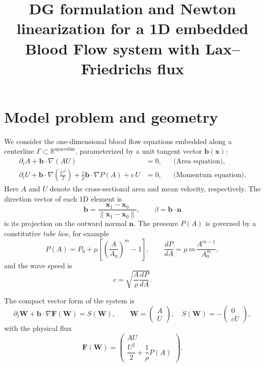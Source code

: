 \documentclass[11pt]{article}
\title{DG formulation and Newton linearization
for a 1D embedded Blood Flow system with Lax--Friedrichs flux}
\author{}
\date{}
\newcommand{\R}{\mathbb{R}}
\begin{document}
\maketitle

\section{Model problem and geometry}

We consider the one-dimensional blood flow equations embedded along a
centerline $\Gamma\subset\R^{\text{spacedim}}$, parameterized by a unit tangent
vector $\bm b(\bm x)$:
\begin{align}
  \partial_t A + \bm b\!\cdot\!\nabla (A U) &= 0,
  && \text{(Area equation)}, \label{eq:area-eq}\\[2mm]
  \partial_t U + \bm b\!\cdot\!\nabla\!\left(\frac{U^2}{2}\right)
  + \frac{1}{\rho}\bm b\!\cdot\!\nabla P(A)
  + c\,U &= 0,
  && \text{(Momentum equation).} \label{eq:momentum-eq}
\end{align}
Here $A$ and $U$ denote the cross-sectional area and mean velocity,
respectively.
The direction vector of each 1D element is
\[
  \bm b = \frac{\bm x_1 - \bm x_0}{\lVert \bm x_1 - \bm x_0\rVert},
  \qquad
  \beta = \bm b\!\cdot\!\bm n
\]
is its projection on the outward normal $\bm n$.
The pressure $P(A)$ is governed by a constitutive \emph{tube law},
for example
\[
  P(A) = P_0 + \mu \!\left[\!\left(\frac{A}{A_0}\right)^m - 1\!\right],
  \qquad
  \frac{dP}{dA} = \mu \,m\,\frac{A^{m-1}}{A_0^m},
\]
and the wave speed is
\[
  c = \sqrt{\frac{A}{\rho}\frac{dP}{dA}}.
\]

The compact vector form of the system is
\begin{equation}
  \partial_t \mathbf{W} + \bm b\!\cdot\!\nabla \mathbf{F}(\mathbf{W})
  = S(\mathbf{W}),
  \qquad
  \mathbf{W} =
  \begin{pmatrix} A \\[1mm] U \end{pmatrix},
  \quad
  S(\mathbf{W}) = -
  \begin{pmatrix} 0 \\[1mm] cU \end{pmatrix},
  \label{eq:model-vector}
\end{equation}
with the physical flux
\[
  \mathbf{F}(\mathbf{W}) =
  \begin{pmatrix}
    A U \\[2mm]
    \dfrac{U^2}{2} + \dfrac{1}{\rho} P(A)
  \end{pmatrix}.
\]
\end{document}
